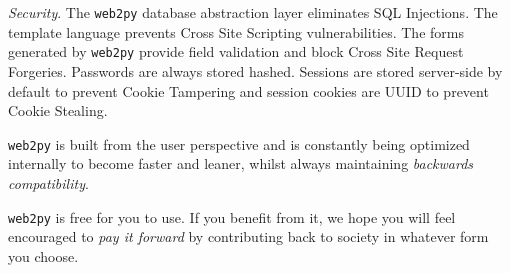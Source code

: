 \documentclass[justified,sixbynine,notoc]{tufte-book}
\def\ft{\small\tt}
\begin{document}
\begin{fullwidth}
{\it Security}. The {\ft web2py} database abstraction layer eliminates SQL Injections. The template language prevents Cross Site Scripting vulnerabilities. The forms generated by {\ft web2py} provide field validation and block Cross Site Request Forgeries. Passwords are always stored hashed. Sessions are stored server-side by default to prevent Cookie Tampering and session cookies are UUID to prevent Cookie Stealing.

{\ft web2py} is built from the user perspective and is constantly being optimized internally to become faster and leaner, whilst always maintaining {\it backwards compatibility}.

{\ft web2py} is free for you to use. If you benefit from it, we hope you will feel encouraged to {\it pay it forward} by contributing back to society in whatever form you choose.


\end{fullwidth}
\end{document}
